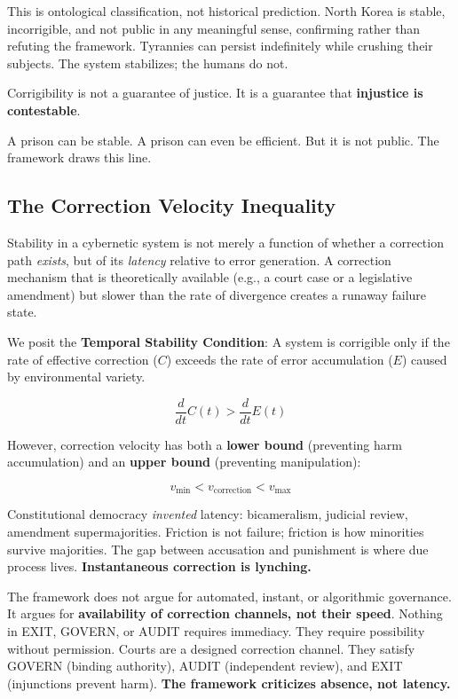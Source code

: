 \documentclass{article}
\begin{document}
This is ontological classification, not historical prediction. North Korea is stable, incorrigible, and not public in any meaningful sense, confirming rather than refuting the framework. Tyrannies can persist indefinitely while crushing their subjects. The system stabilizes; the humans do not.

\begin{clarification}[title=The Core Claim]
Corrigibility is not a guarantee of justice. It is a guarantee that \textbf{injustice is contestable}.
\end{clarification}

A prison can be stable. A prison can even be efficient. But it is not public. The framework draws this line.

\subsection{The Correction Velocity Inequality}
\label{subsec:velocity}

Stability in a cybernetic system is not merely a function of whether a correction path \textit{exists}, but of its \textit{latency} relative to error generation. A correction mechanism that is theoretically available (e.g., a court case or a legislative amendment) but slower than the rate of divergence creates a runaway failure state.

We posit the \textbf{Temporal Stability Condition}: A system is corrigible only if the rate of effective correction ($C$) exceeds the rate of error accumulation ($E$) caused by environmental variety.

\begin{equation}
\frac{d}{dt} C(t) > \frac{d}{dt} E(t)
\label{eq:velocity-lower}
\end{equation}

However, correction velocity has both a \textbf{lower bound} (preventing harm accumulation) and an \textbf{upper bound} (preventing manipulation):

\begin{equation}
v_{\min} < v_{\text{correction}} < v_{\max}
\label{eq:velocity-bounds}
\end{equation}

\begin{clarification}[title=Velocity Bounds]
Constitutional democracy \textit{invented} latency: bicameralism, judicial review, amendment supermajorities. Friction is not failure; friction is how minorities survive majorities. The gap between accusation and punishment is where due process lives. \textbf{Instantaneous correction is lynching.}

The framework does not argue for automated, instant, or algorithmic governance. It argues for \textbf{availability of correction channels, not their speed}. Nothing in EXIT, GOVERN, or AUDIT requires immediacy. They require possibility without permission. Courts are a designed correction channel. They satisfy GOVERN (binding authority), AUDIT (independent review), and EXIT (injunctions prevent harm). \textbf{The framework criticizes absence, not latency.}
\end{clarification}
\end{document}
